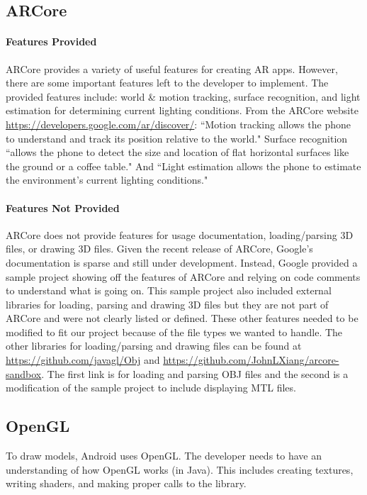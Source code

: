 \subsection{ARCore}
    \paragraph{Features Provided}

    ARCore provides a variety of useful features for creating AR apps. However, there are some important features left to the developer to implement. The provided features include: world \& motion tracking, surface recognition, and light estimation for determining current lighting conditions. From the ARCore website \url{https://developers.google.com/ar/discover/}: ``Motion tracking allows the phone to understand and track its position relative to the world." Surface recognition ``allows the phone to detect the size and location of flat horizontal surfaces like the ground or a coffee table." And ``Light estimation allows the phone to estimate the environment's current lighting conditions."

    \paragraph{Features Not Provided}

    ARCore does not provide features for usage documentation, loading/parsing 3D files, or drawing 3D files. Given the recent release of ARCore, Google's documentation is sparse and still under development. Instead, Google provided a sample project showing off the features of ARCore and relying on code comments to understand what is going on. This sample project also included external libraries for loading, parsing and drawing 3D files but they are not part of ARCore and were not clearly listed or defined. These other features needed to be modified to fit our project because of the file types we wanted to handle. The other libraries for loading/parsing and drawing files can be found at \url{https://github.com/javagl/Obj} and \url{https://github.com/JohnLXiang/arcore-sandbox}. The first link is for loading and parsing OBJ files and the second is a modification of the sample project to include displaying MTL files.

\subsection{OpenGL}
    To draw models, Android uses OpenGL. The developer needs to have an understanding of how OpenGL works (in Java). This includes creating textures, writing shaders, and making proper calls to the library.

